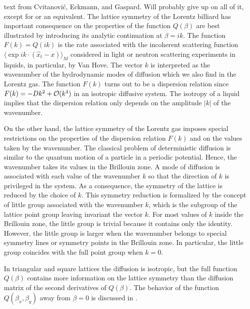     {text from Cvitanovi\'c,  Eckmann, and Gaspard.
    Will probably give up on all of it, except for 
    or an equivalent.}
The lattice symmetry of the Lorentz billiard has important consequence on
the properties of the function $Q(\beta)$ are best illustrated by
introducing its analytic continuation at $\beta = i k$.  The function
$F(k)=Q(ik)$ is the rate associated with the incoherent scattering
function $\langle \exp i k \cdot (\hat x_t - x) \rangle_M$ considered in
light or neutron scattering experiments in liquids, in particular, by Van
Hove. The vector $k$ is interpreted as the
wavenumber of the hydrodynamic modes of diffusion which we also find in
the Lorentz gas.  The function $F(k)$ turns out to be a dispersion
relation since $F(k)=-D k^2 + {\cal O}(k^4)$ in an isotropic diffusive
system.  The isotropy of a liquid implies that the dispersion relation
only depends on the amplitude $\vert k\vert$ of the wavenumber.

On the other hand, the lattice symmetry of the Lorentz gas
imposes special restrictions on the properties of the dispersion relation
$F(k)$ and on the values taken by the wavenumber.  The classical
problem of deterministic diffusion is similar to the quantum motion of a particle in a
periodic potential.  Hence, the wavenumber takes its values in the
Brillouin zone.  A mode of diffusion is associated with each value of
the wavenumber $k$ so that the direction of $k$ is privileged in the
system.  As a consequence, the symmetry of the lattice is reduced by the choice
of $k$.  This symmetry reduction is formalized by the concept of little group
associated with the wavenumber $k$, which is the subgroup of the lattice point
group leaving invariant the vector $k$.  For most values of $k$ inside the
Brillouin zone, the little group is trivial because it contains only the
identity.  However, the little group is larger when the wavenumber belongs to
special symmetry lines or symmetry points in the Brillouin zone.  In particular,
the little group coincides with the full point group when $k=0$.

In triangular and square lattices the diffusion is isotropic, but the
full function $Q(\beta)$ contains more information on the lattice
symmetry than the diffusion matrix of the second derivatives of
$Q(\beta)$. The behavior of the function $Q(\beta_x, \beta_y)$ away from
$\beta=0$ is discussed in .

